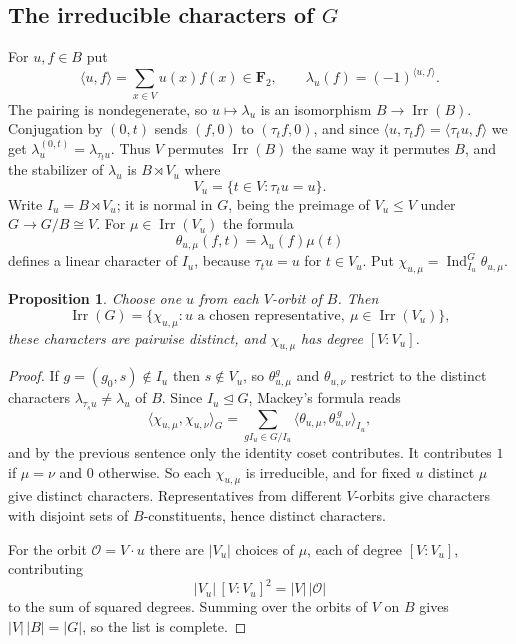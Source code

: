 \documentclass[11pt,a4paper,reqno]{amsart}
\newtheorem{proposition}[theorem]{Proposition}
\theoremstyle{definition}
\theoremstyle{remark}
\newcommand{\F}{\mathbf F}
\newcommand{\Irr}{\operatorname{Irr}}
\newcommand{\Ind}{\operatorname{Ind}}
\begin{document}
\subsection{The irreducible characters of \texorpdfstring{$G$}{G}}

For $u,f\in B$ put
\[
 \langle u,f\rangle=\sum_{x\in V}u(x)f(x)\in\F_2,
 \qquad
 \lambda_u(f)=(-1)^{\langle u,f\rangle} .
\]
The pairing is nondegenerate, so $u\mapsto\lambda_u$ is an isomorphism
$B\to\Irr(B)$.  Conjugation by $(0,t)$ sends $(f,0)$ to $(\tau_tf,0)$,
and since $\langle u,\tau_tf\rangle=\langle\tau_tu,f\rangle$ we get
$\lambda_u^{(0,t)}=\lambda_{\tau_tu}$.  Thus $V$ permutes $\Irr(B)$ the
same way it permutes $B$, and the stabilizer of $\lambda_u$ is
$B\rtimes V_u$ where
\[
 V_u=\{t\in V:\tau_tu=u\} .
\]
Write $I_u=B\rtimes V_u$; it is normal in $G$, being the preimage of
$V_u\le V$ under $G\to G/B\cong V$.  For $\mu\in\Irr(V_u)$ the formula
\[
 \theta_{u,\mu}(f,t)=\lambda_u(f)\mu(t)
\]
defines a linear character of $I_u$, because $\tau_tu=u$ for $t\in
V_u$.  Put $\chi_{u,\mu}=\Ind_{I_u}^G\theta_{u,\mu}$.

\begin{proposition}\label{prop:all-irr}
Choose one $u$ from each $V$-orbit of $B$.  Then
\[
 \Irr(G)=\{\chi_{u,\mu}:u\text{ a chosen representative},\
 \mu\in\Irr(V_u)\},
\]
these characters are pairwise distinct, and $\chi_{u,\mu}$ has degree
$[V:V_u]$.
\end{proposition}

\begin{proof}
If $g=(g_0,s)\notin I_u$ then $s\notin V_u$, so
$\theta_{u,\mu}^g$ and $\theta_{u,\nu}$ restrict to the distinct
characters $\lambda_{\tau_su}\neq\lambda_u$ of $B$.  Since $I_u\trianglelefteq
G$, Mackey's formula reads
\[
 \langle\chi_{u,\mu},\chi_{u,\nu}\rangle_G
 =\sum_{gI_u\in G/I_u}
 \langle\theta_{u,\mu},\theta_{u,\nu}^{\,g}\rangle_{I_u},
\]
and by the previous sentence only the identity coset contributes.  It
contributes $1$ if $\mu=\nu$ and $0$ otherwise.  So each
$\chi_{u,\mu}$ is irreducible, and for fixed $u$ distinct $\mu$ give
distinct characters.  Representatives from different $V$-orbits give
characters with disjoint sets of $B$-constituents, hence distinct
characters.

For the orbit $\mathcal O=V\cdot u$ there are $|V_u|$ choices of $\mu$,
each of degree $[V:V_u]$, contributing
\[
 |V_u|\,[V:V_u]^2=|V|\,|\mathcal O|
\]
to the sum of squared degrees.  Summing over the orbits of $V$ on $B$
gives $|V|\,|B|=|G|$, so the list is complete.
\end{proof}
\end{document}
